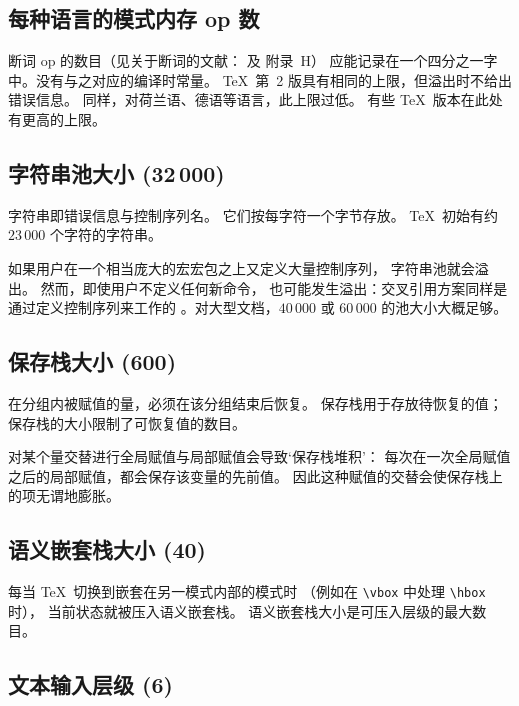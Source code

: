 \documentclass[a4paper]{rapport3}
\begin{document}
\subsection{每种语言的模式内存 op 数}

断词 op 的数目（见关于断词的文献：\cite{Liang}
及 \cite{Knuth:TeXbook} 附录~H）
应能记录在一个四分之一字中。没有与之对应的编译时常量。
\TeX\ 第~2 版具有相同的上限，但溢出时不给出错误信息。
同样，对荷兰语、德语等语言，此上限过低。
有些 \TeX\ 版本在此处有更高的上限。

\subsection{字符串池大小 (32$\,$000)}

字符串即错误信息与控制序列名。
它们按每字符一个字节存放。
\TeX\ 初始有约 $23\,000$ 个字符的字符串。

如果用户在一个相当庞大的宏宏包之上又定义大量控制序列，
字符串池就会溢出。
然而，即使用户不定义任何新命令，
\mdqon
也可能发生溢出：交叉引用方案同样是通过定义控制序列来工作的
\mdqoff
。对大型文档，$40\,000$ 或 $60\,000$ 的池大小大概足够。

\subsection{保存栈大小 {\rm(600)}}

在分组内被赋值的量，必须在该分组结束后恢复。
保存栈用于存放待恢复的值；
保存栈的大小限制了可恢复值的数目。

对某个量交替进行全局赋值与局部赋值会导致`保存栈堆积'：
每次在一次全局赋值之后的局部赋值，都会保存该变量的先前值。
因此这种赋值的交替会使保存栈上的项无谓地膨胀。

\subsection{语义嵌套栈大小 {\rm(40)}}

每当 \TeX\ 切换到嵌套在另一模式内部的模式时
（例如在 \verb-\vbox- 中处理 \verb-\hbox- 时），
当前状态就被压入语义嵌套栈。
语义嵌套栈大小是可压入层级的最大数目。

\subsection{文本输入层级 {\rm(6)}}
\end{document}
